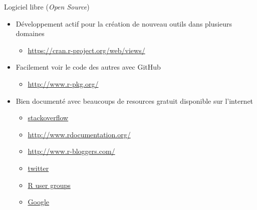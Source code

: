 \documentclass[11pt]{beamer}\usepackage[]{graphicx}\usepackage[]{color}
\begin{document}
\begin{frame}{Logiciel libre (\textit{Open Source})}

\begin{itemize}
  \setlength\itemsep{1.5em}
\item D\'{e}veloppement actif pour la cr\'{e}ation de nouveau outils dans plusieurs domaines  
\begin{itemize}
\item \href{https://cran.r-project.org/web/views/}{https://cran.r-project.org/web/views/}
\end{itemize} 
\item Facilement voir le code des autres avec GitHub 
\begin{itemize}
\item \href{http://www.r-pkg.org/}{http://www.r-pkg.org/}
\end{itemize}
\item Bien document\'{e} avec beaucoups de resources gratuit disponible sur l'internet  
\begin{itemize}
\item \href{http://stackoverflow.com/questions/tagged/r}{stackoverflow}
\item \href{http://www.rdocumentation.org/}{http://www.rdocumentation.org/} \item \href{http://www.r-bloggers.com/}{http://www.r-bloggers.com/} 
\item \href{https://twitter.com/search?q=\%23rstats}{twitter} 
\item \href{http://blog.revolutionanalytics.com/local-r-groups.html}{R user groups}
\item \href{https://www.google.ca/}{Google}
\end{itemize}
\end{itemize}


\end{frame}
\end{document}
